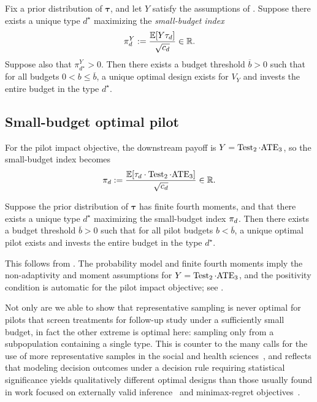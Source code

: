 \begin{theorem}
  \label{thm:optimal-small-budget-design-general}
  Fix a prior distribution of $\bm\tau$, and let $Y$ satisfy the assumptions of .
  Suppose there exists a unique type $d^\star$ maximizing the \emph{small-budget index}
  \[
    \pi_d^Y
    :=
    \frac{\mathbb{E}[Y \tau_d]}{\sqrt{c_{d}}}
    \in
    \mathbb{R}.
  \]
  Suppose also that $\pi_{d^\star}^Y>0$.
  Then there exists a budget threshold $\overline{b}>0$ such that for all budgets $0 < b \le \overline{b}$, a unique optimal design exists for $V_Y$ and invests the entire budget in the type $d^\star$.
\end{theorem}

\subsection{Small-budget optimal pilot}
\label{sec:small-budget-optimal-pilot}

For the pilot impact objective, the downstream payoff is $Y=\operatorname{Test}_2\cdot\mathrm{ATE}_3$, so the small-budget index becomes
\[
  \pi_d
  :=
  \frac{\mathbb{E}[\tau_d \cdot \operatorname{Test}_2 \cdot \mathrm{ATE}_3]}{\sqrt{c_{d}}}
  \in
  \mathbb{R}.
\]

\begin{corollary}
  \label{cor:optimal-small-budget-pilot}
  Suppose the prior distribution of $\bm\tau$ has finite fourth moments, and that there exists a unique type $d^\star$ maximizing the small-budget index $\pi_d$.
  Then there exists a budget threshold $\overline{b}>0$ such that for all pilot budgets $b<\overline{b}$, a unique optimal pilot exists and invests the entire budget in the type $d^\star$.
\end{corollary}

This follows from .
The probability model and finite fourth moments imply the non-adaptivity and moment assumptions for $Y=\operatorname{Test}_2\cdot\mathrm{ATE}_3$, and the positivity condition is automatic for the pilot impact objective; see .

Not only are we able to show that representative sampling is never optimal for pilots that screen treatments for follow-up study under a sufficiently small budget, in fact the other extreme is optimal here: sampling only from a subpopulation containing a single type.
This is counter to the many calls for the use of more representative samples in the social and health sciences~\cite{FDAHH20, DepartmentofEducationBo22,BryanTi21}, and reflects that modeling decision outcomes under a decision rule requiring statistical significance yields qualitatively different optimal designs than those usually found in work focused on externally valid inference~\cite{Tipton13,EgamiLe23,Bouyamourn25} and minimax-regret objectives~\cite{HuZh24,OleaPr25}.

